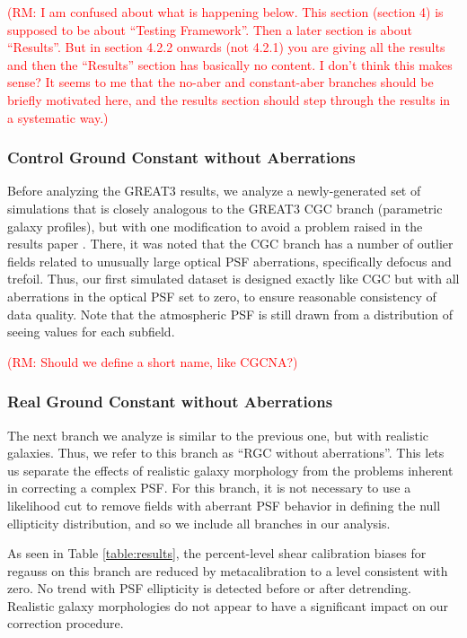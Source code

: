 \documentclass[iop]{emulateapj}
\newcommand\rmcomment[1]{\textcolor{red}{(RM: #1)}}
\begin{document}
\rmcomment{I am confused about what is happening below.  This section
  (section 4) is supposed to be about ``Testing Framework''.  Then a
  later section is about ``Results''.  But in section 4.2.2 onwards
  (not 4.2.1) you are giving all the results and then the ``Results''
  section has basically no content.  I don't think this makes sense?
  It seems to me that the no-aber and constant-aber branches should be
  briefly motivated here, and the results section should step through
  the results in a systematic way.}

\subsubsection{Control Ground Constant without Aberrations}

Before analyzing the GREAT3 results, we analyze a newly-generated set
of simulations that is closely analogous to the GREAT3 CGC branch
(parametric galaxy profiles), but with one modification to avoid a
problem raised in the results paper \citep{2015MNRAS.450.2963M}.
There, it was noted that the CGC branch has a number of outlier fields
related to unusually large optical PSF aberrations, specifically
defocus and trefoil.  Thus, our first simulated dataset is designed
exactly like CGC but with all aberrations in the optical PSF set to
zero, to ensure reasonable consistency of data quality.  Note that the
atmospheric PSF is still drawn from a distribution of seeing values
for each subfield.

\rmcomment{Should we define a short name, like CGCNA?}

\subsubsection{Real Ground Constant without Aberrations}

The next branch we analyze is similar to the previous one, but with
realistic galaxies.  Thus, we refer to this branch as ``RGC without
aberrations''. This lets us separate the effects of realistic galaxy
morphology from the problems inherent in correcting a complex PSF. For
this branch, it is not necessary to use a likelihood cut to remove
fields with aberrant PSF behavior in defining the null ellipticity
distribution, and so we include all branches in our analysis.

As seen in Table \ref{table:results}, the percent-level shear
calibration biases for regauss on this branch are reduced by metacalibration
to a level consistent with zero. No trend with PSF ellipticity is
detected before or after detrending. Realistic galaxy morphologies do
not appear to have a significant impact on our correction procedure.
\end{document}
